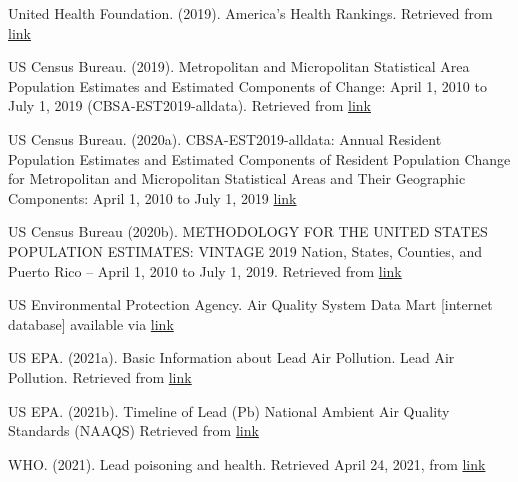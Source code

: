 \documentclass[
  12pt,
]{article}
\begin{document}
United Health Foundation. (2019). America's Health Rankings. Retrieved
from
\href{https://assets.americashealthrankings.org/app/uploads/ahr_2019annualreport.pdf}{link}

US Census Bureau. (2019). Metropolitan and Micropolitan Statistical Area
Population Estimates and Estimated Components of Change: April 1, 2010
to July 1, 2019 (CBSA-EST2019-alldata). Retrieved from
\href{https://www.census.gov/data/tables/time-series/demo/popest/2010s-total-metro-and-micro-statistical-areas.html\#par_textimage}{link}

US Census Bureau. (2020a). CBSA-EST2019-alldata: Annual Resident
Population Estimates and Estimated Components of Resident Population
Change for Metropolitan and Micropolitan Statistical Areas and Their
Geographic Components: April 1, 2010 to July 1, 2019
\href{https://www2.census.gov/programs-surveys/popest/technical-documentation/file-layouts/2010-2019/cbsa-est2019-alldata.pdf}{link}

US Census Bureau (2020b). METHODOLOGY FOR THE UNITED STATES POPULATION
ESTIMATES: VINTAGE 2019 Nation, States, Counties, and Puerto Rico --
April 1, 2010 to July 1, 2019. Retrieved from
\href{https://www2.census.gov/programs-surveys/popest/technical-documentation/methodology/2010-2019/natstcopr-methv2.pdf}{link}

US Environmental Protection Agency. Air Quality System Data Mart
{[}internet database{]} available via
\href{https://www.epa.gov/airdata.\%20Accessed\%20April\%2005,\%202021.}{link}

US EPA. (2021a). Basic Information about Lead Air Pollution. Lead Air
Pollution. Retrieved from
\href{https://www.epa.gov/lead-air-pollution/basic-information-about-lead-air-pollution\#:~:text=At\%20the\%20national\%20level\%2C\%20major,usually\%20found\%20near\%20lead\%20smelters.}{link}

US EPA. (2021b). Timeline of Lead (Pb) National Ambient Air Quality
Standards (NAAQS) Retrieved from
\href{https://www.epa.gov/lead-air-pollution/timeline-lead-pb-national-ambient-air-quality-standards-naaqs}{link}

WHO. (2021). Lead poisoning and health. Retrieved April 24, 2021, from
\href{https://www.who.int/news-room/fact-sheets/detail/lead-poisoning-and-health}{link}
\end{document}
